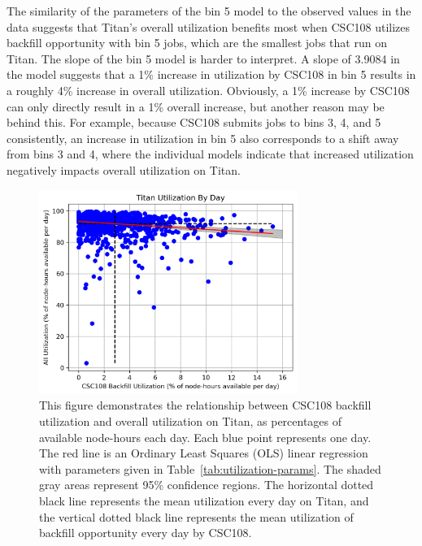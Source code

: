 The similarity of the parameters of the bin 5 model to the observed values in
the data suggests that Titan's overall utilization benefits most when CSC108
utilizes backfill opportunity with bin 5 jobs, which are the smallest jobs that
run on Titan. The slope of the bin 5 model is harder to interpret. A slope of
{3.9084} in the model suggests that a 1\% increase in utilization by CSC108 in
bin 5 results in a roughly 4\% increase in overall utilization. Obviously, a
1\% increase by CSC108 can only directly result in a 1\% overall increase, but
another reason may be behind this. For example, because CSC108 submits jobs to
bins 3, 4, and 5 consistently, an increase in utilization in bin 5 also
corresponds to a shift away from bins 3 and 4, where the individual models
indicate that increased utilization negatively impacts overall utilization on
Titan.


\begin{figure}
  \includegraphics[width=0.75\textwidth]{images/linfit-utilization-by-true-day-all.png}
\caption{This figure demonstrates the relationship between CSC108 backfill
utilization and overall utilization on Titan, as percentages of available
node-hours each day. Each blue point represents one day. The red line is an
Ordinary Least Squares (OLS) linear regression with parameters given in
Table~\ref{tab:utilization-params}. The shaded gray areas represent 95\%
confidence regions. The horizontal dotted black line represents the mean
utilization every day on Titan, and the vertical dotted black line represents
the mean utilization of backfill opportunity every day by CSC108.}
\label{fig:utilization-all}
\end{figure}


